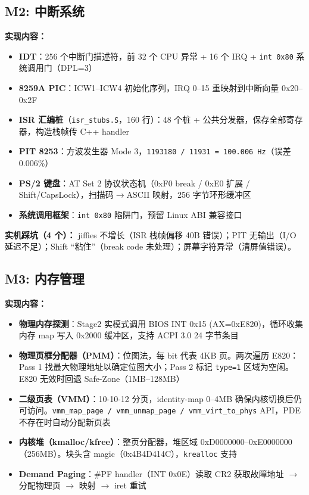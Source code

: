 \documentclass[12pt,a4paper]{article}
\begin{document}
\subsection{M2: 中断系统}

\textbf{实现内容：}
\begin{itemize}
    \item \textbf{IDT}：256 个中断门描述符，前 32 个 CPU 异常 + 16 个 IRQ + \texttt{int 0x80} 系统调用门（DPL=3）
    \item \textbf{8259A PIC}：ICW1--ICW4 初始化序列，IRQ 0--15 重映射到中断向量 0x20--0x2F
    \item \textbf{ISR 汇编桩}（\texttt{isr\_stubs.S}，160 行）：48 个桩 + 公共分发器，保存全部寄存器，构造栈帧传 C++ handler
    \item \textbf{PIT 8253}：方波发生器 Mode 3，\texttt{1193180 / 11931 = 100.006 Hz}（误差 0.006\%）
    \item \textbf{PS/2 键盘}：AT Set 2 协议状态机（0xF0 break / 0xE0 扩展 / Shift/CapsLock），扫描码$\to$ASCII 映射，256 字节环形缓冲区
    \item \textbf{系统调用框架}：\texttt{int 0x80} 陷阱门，预留 Linux ABI 兼容接口
\end{itemize}

\textbf{实机踩坑（4 个）：} jiffies 不增长（ISR 栈帧偏移 40B 错误）；PIT 无输出（I/O 延迟不足）；Shift ``粘住''（break code 未处理）；屏幕字符异常（清屏值错误）。

\subsection{M3: 内存管理}

\textbf{实现内容：}
\begin{itemize}
    \item \textbf{物理内存探测}：Stage2 实模式调用 BIOS INT 0x15 (AX=0xE820)，循环收集内存 map 写入 0x2000 缓冲区，支持 ACPI 3.0 24 字节条目
    \item \textbf{物理页框分配器（PMM）}：位图法，每 bit 代表 4KB 页。两次遍历 E820：Pass 1 找最大物理地址以确定位图大小；Pass 2 标记 \texttt{type=1} 区域为空闲。E820 无效时回退 Safe-Zone（1MB--128MB）
    \item \textbf{二级页表（VMM）}：10-10-12 分页，identity-map 0--4MB 确保内核切换后仍可访问。\texttt{vmm\_map\_page / vmm\_unmap\_page / vmm\_virt\_to\_phys} API，PDE 不存在时自动分配新页表
    \item \textbf{内核堆（kmalloc/kfree）}：整页分配器，堆区域 0xD0000000--0xE0000000（256MB）。块头含 magic（0x4B4D414C），\texttt{krealloc} 支持
    \item \textbf{Demand Paging}：\#PF handler（INT 0x0E）读取 CR2 获取故障地址 $\to$ 分配物理页 $\to$ 映射 $\to$ iret 重试
\end{itemize}
\end{document}
